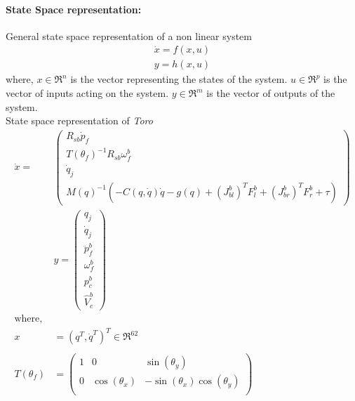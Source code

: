 \paragraph{State Space representation:}
General state space representation of a non linear system
\begin{equation}
\label{eq:dyn_nl}
	\begin{split}
	\dot{x} = f(x,u)\\
	y = h(x,u)
	\end{split}
\end{equation}
where, $x \in \Re^{n}$ is the vector representing the states of the system. $u \in \Re^{p}$ is the vector of inputs acting on the system. $y \in \Re^{m}$ is the vector of outputs of the system.\\
State space representation of \emph{Toro}
\begin{equation}
\label{eq:toro}
	\begin{split}
	\dot{x} = &
	\begin{pmatrix}
	R_{sb}\dot{p}_f\\
	T(\theta_{f})^{-1}R_{sb}\omega_f^b \\
	\dot{q}_{j}\\
	M(q)^{-1}(-C(q,\dot{q})\dot{q} -g(q) + (J_{bl}^{b})^{T}F_{l}^{b} +(J_{br}^{b})^{T}F_{r}^{b} + \tau)	
	\end{pmatrix}
	\\&	y = 
	\begin{pmatrix}
	q_{j} \\ \dot{q}_{j} \\ \ddot{p}_{f}^b \\ \omega_{f}^{b}\\ p_{c}^{b}\\ \hat{V}_{c}^{b}
	\end{pmatrix}
	\\ \text{where, }\\ x &= (q^{T},\dot{q}^{T})^{T} \in \Re^{62}\\
	\\T(\theta_{f}) &=
	\begin{pmatrix}
	1 &0 &\sin(\theta_{y})\\
	0 &\cos(\theta_{x}) &-\sin(\theta_{x})\cos(\theta_{y})\\

\end{pmatrix}
\end{split}
\end{equation}
